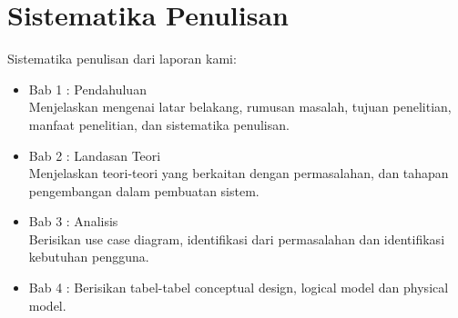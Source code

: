 \section{Sistematika Penulisan}
Sistematika penulisan dari laporan kami:
\begin{itemize}
	\item Bab 1 : Pendahuluan \\ Menjelaskan mengenai latar belakang, rumusan masalah, tujuan penelitian, manfaat penelitian, dan sistematika penulisan.
	\item Bab 2 : Landasan Teori \\ Menjelaskan teori-teori yang berkaitan dengan permasalahan, dan tahapan pengembangan dalam pembuatan sistem.
	\item Bab 3 : Analisis \\ Berisikan use case diagram, identifikasi dari permasalahan dan identifikasi kebutuhan pengguna.
	\item Bab 4 : Berisikan tabel-tabel conceptual design, logical model dan physical model.
\end{itemize}
